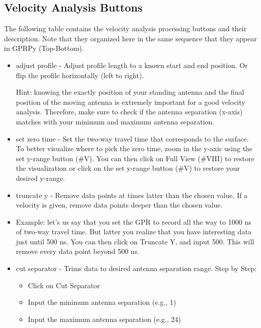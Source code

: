\documentclass[12pt]{article}
\begin{document}
				
						
	\subsection{Velocity Analysis Buttons}
	
	The following table contains the velocity analysis processing buttons and their description. Note that they organized here in the same sequence that they appear in GPRPy (Top-Bottom). 
	
\begin{itemize}
    \item adjust profile - Adjust profile length to a known start and end position. Or flip the profile horizontally (left to right). 
    
Hint: knowing the exactly position of your standing antenna and the final position of the moving antenna is extremely important for a good velocity analysis. Therefore, make sure to check if the antenna separation (x-axis) matches with your minimum and maximum antenna separation. 
    
    \item set zero time - Set the two-way travel time that corresponds to the surface.
To better visualize where to pick the zero time, zoom in the y-axis using the set y-range button (#V). 
You can then click on Full View (#VIII) to restore the visualization or click on the set y-range button (#V) to restore your desired y-range.

    \item truncate y - Remove data points at times latter than the chosen value. If a velocity is given, remove data points deeper than the chosen value.

\item Example: let’s us say that you set the GPR to record all the way to 1000 ns of two-way travel time. But latter you realize that you have interesting data just until 500 ns. You can then click on Truncate Y, and input 500. This will remove every data point beyond 500 ns.

    \item cut separator - Trims data to desired antenna separation range.
Step by Step:
\begin{itemize}
    \item Click on Cut Separator
    \item Input the minimum antenna separation (e.g., 1)
    \item Input the maximum antenna separation (e.g., 24)
\end{itemize}


\end{itemize}
\end{document}
